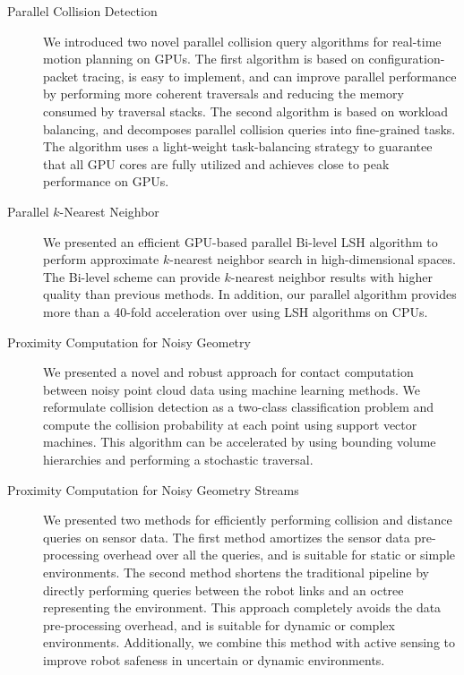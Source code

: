 \begin{description}
\item[Parallel Collision Detection] We introduced two novel parallel collision query algorithms for real-time motion planning on GPUs. The first algorithm is based on configuration-packet tracing, is easy to implement, and can improve parallel performance by performing more coherent traversals and reducing the memory consumed by traversal stacks. The second algorithm is based on workload balancing, and decomposes parallel collision queries into fine-grained tasks. The algorithm uses a light-weight task-balancing strategy to guarantee that all GPU cores are fully utilized and achieves close to peak performance on GPUs.
\item[Parallel $k$-Nearest Neighbor] We presented an efficient GPU-based parallel Bi-level LSH algorithm to perform approximate $k$-nearest neighbor search in high-dimensional spaces. The Bi-level scheme can provide $k$-nearest neighbor results with higher quality than previous methods. In addition, our parallel algorithm provides more than a 40-fold acceleration over using LSH algorithms on CPUs.
\item[Proximity Computation for Noisy Geometry] We presented a novel and robust approach for contact computation between noisy point cloud data using machine learning methods. We reformulate collision detection as a two-class classification problem and compute the collision probability at each point using support vector machines. This algorithm can be accelerated by using bounding volume hierarchies and performing a stochastic traversal.
\item[Proximity Computation for Noisy Geometry Streams] We presented two methods for efficiently performing collision and distance queries on sensor data. The first method amortizes the sensor data pre-processing overhead over all the queries, and is suitable for static or simple environments. The second method shortens the traditional pipeline by directly performing queries between the robot links and an octree representing the environment. This approach completely avoids the data pre-processing overhead, and is suitable for dynamic or complex environments. Additionally, we combine this method with active sensing to improve robot safeness in uncertain or dynamic environments.
\end{description}

